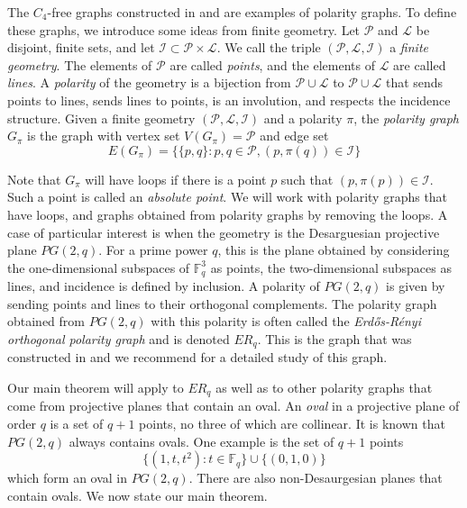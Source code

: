 \documentclass[12pt]{article}
\begin{document}
The $C_4$-free graphs constructed in \cite{brown1966graphs} and \cite{erd1966r} are examples of polarity graphs.  To define these graphs, we introduce some ideas from finite geometry.  Let $\mathcal{P}$ and $\mathcal{L}$ be disjoint, finite sets, and let $\mathcal{I}\subset \mathcal{P}\times \mathcal{L}$. We call the triple $(\mathcal{P}, \mathcal{L}, \mathcal{I})$ a {\em finite geometry}.  The elements of $\mathcal{P}$ are called {\em points}, and the elements of $\mathcal{L}$ are called {\em lines}.   A {\em polarity} of the geometry is a bijection from $\mathcal{P}\cup \mathcal{L}$ to $\mathcal{P}\cup \mathcal{L}$ that sends points to lines, sends lines to points, is an involution, and respects the incidence structure.  Given a finite geometry $(\mathcal{P}, \mathcal{L}, \mathcal{I})$ and a polarity $\pi$, the {\em polarity graph} $G_\pi$ is the graph with vertex set $V(G_\pi) = \mathcal{P}$ and edge set
$$ E(G_\pi) = \{\{p,q\}: p,q\in \mathcal{P}, (p, \pi(q))\in \mathcal{I}\} $$

Note that $G_\pi$ will have loops if there is a point $p$ such that $(p, \pi(p))\in \mathcal{I}$.
Such a point is called an {\em absolute point}. We will work with polarity graphs that have loops, and graphs obtained from polarity graphs by removing the loops.  A case of particular interest is when the geometry is
the Desarguesian projective plane $PG(2,q)$.   For a prime power $q$, this is the plane obtained by considering the one-dimensional subspaces of $\mathbb{F}_q^3$ as points, the two-dimensional subspaces as lines, and incidence is defined by inclusion. A polarity of $PG(2,q)$ is given by sending points and lines to their orthogonal complements. The polarity graph obtained from $PG(2,q)$ with this polarity is often called the {\em Erd\H{o}s-R\'{e}nyi orthogonal polarity graph} and is denoted $ER_q$.  This is the graph that was constructed in \cite{brown1966graphs, erd1966r} and we recommend \cite{bachraty2014polarity} for a detailed study of this graph.

Our main theorem will apply to $ER_q$ as well as to other polarity graphs that come from projective planes that contain an oval.
An \emph{oval} in a projective plane of order $q$ is a set of $q+1$ points, no three of which are collinear.  It is known that $PG(2,q)$ always contains ovals.  One example is the set of $q+1$ points
$$ \{(1 , t , t^2 ) : t \in \mathbb{F}_q \} \cup \{ (0,1,0) \} $$
which form an oval in $PG(2,q)$.  There are also non-Desaurgesian planes that contain ovals.  We now state our main theorem.
\end{document}
